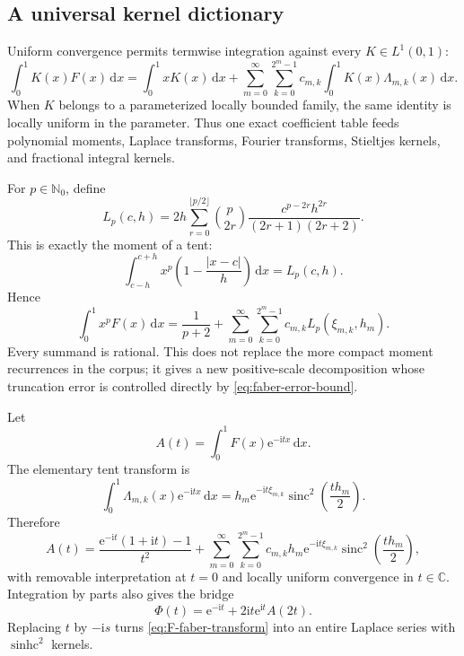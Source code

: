\documentclass[11pt,oneside]{article}
\theoremstyle{definition}
\theoremstyle{remark}
\newcommand{\C}{\mathbb C}
\newcommand{\N}{\mathbb N}
\newcommand{\sinc}{\operatorname{sinc}}
\newcommand{\sinhc}{\operatorname{sinhc}}
\newcommand{\dd}{\,\mathrm d}
\newcommand{\ii}{\mathrm i}
\newcommand{\e}{\mathrm e}
\newcommand{\1}{\mathbf 1}
\begin{document}
\subsection{A universal kernel dictionary}

Uniform convergence permits termwise integration against every
$K\in L^1(0,1)$:
\begin{equation}
 \int_0^1K(x)F(x)\dd x
 =\int_0^1xK(x)\dd x
 +\sum_{m=0}^\infty\sum_{k=0}^{2^m-1}
 c_{m,k}\int_0^1K(x)\Lambda_{m,k}(x)\dd x.               \label{eq:faber-kernel-dictionary}
\end{equation}
When $K$ belongs to a parameterized locally bounded family, the same identity
is locally uniform in the parameter.  Thus one exact coefficient table feeds
polynomial moments, Laplace transforms, Fourier transforms, Stieltjes
kernels, and fractional integral kernels.

For $p\in\N_0$, define
\begin{equation}
 L_p(c,h)=2h\sum_{r=0}^{\lfloor p/2\rfloor}
 \binom{p}{2r}\frac{c^{p-2r}h^{2r}}{(2r+1)(2r+2)}.       \label{eq:tent-moment}
\end{equation}
This is exactly the moment of a tent:
\begin{equation}
 \int_{c-h}^{c+h}x^p\left(1-\frac{|x-c|}{h}\right)\dd x
 =L_p(c,h).                                              \label{eq:tent-moment-integral}
\end{equation}
Hence
\begin{equation}
 \boxed{\displaystyle
 \int_0^1x^pF(x)\dd x
 =\frac1{p+2}+
 \sum_{m=0}^\infty\sum_{k=0}^{2^m-1}
 c_{m,k}L_p(\xi_{m,k},h_m).}                             \label{eq:faber-polynomial-moment}
\end{equation}
Every summand is rational.  This does not replace the more compact moment
recurrences in the corpus; it gives a new positive-scale decomposition whose
truncation error is controlled directly by \eqref{eq:faber-error-bound}.

Let
\begin{equation}
 A(t)=\int_0^1F(x)\e^{-\ii tx}\dd x.                     \label{eq:A-definition}
\end{equation}
The elementary tent transform is
\begin{equation}
 \int_0^1\Lambda_{m,k}(x)\e^{-\ii tx}\dd x
 =h_m\e^{-\ii t\xi_{m,k}}
   \sinc^2\!\left(\frac{th_m}{2}\right).                \label{eq:tent-transform}
\end{equation}
Therefore
\begin{equation}
 \boxed{\displaystyle
 A(t)=\frac{\e^{-\ii t}(1+\ii t)-1}{t^2}
 +\sum_{m=0}^\infty\sum_{k=0}^{2^m-1}
 c_{m,k}h_m\e^{-\ii t\xi_{m,k}}
 \sinc^2\!\left(\frac{th_m}{2}\right),}                \label{eq:F-faber-transform}
\end{equation}
with removable interpretation at $t=0$ and locally uniform convergence in
$t\in\C$.  Integration by parts also gives the bridge
\begin{equation}
 \Phi(t)=\e^{-\ii t}+2\ii t\e^{\ii t}A(2t).             \label{eq:A-Phi-bridge}
\end{equation}
Replacing $t$ by $-\ii s$ turns \eqref{eq:F-faber-transform} into an entire
Laplace series with $\sinhc^2$ kernels.
\end{document}
